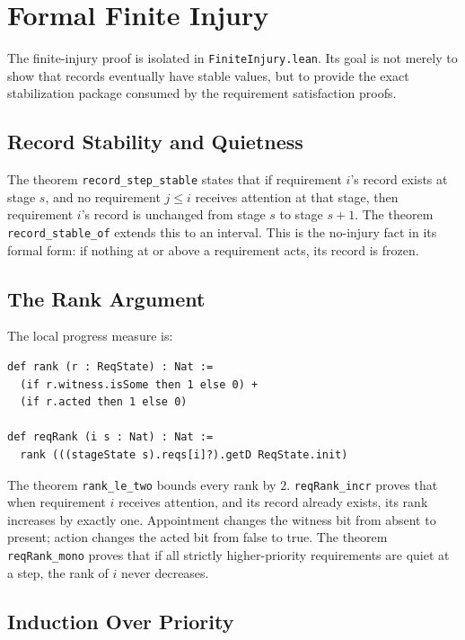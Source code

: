 \section{Formal Finite Injury}

The finite-injury proof is isolated in \texttt{FiniteInjury.lean}.  Its
goal is not merely to show that records eventually have stable values, but
to provide the exact stabilization package consumed by the requirement
satisfaction proofs.

\subsection{Record Stability and Quietness}

The theorem \texttt{record_step_stable} states that if requirement \(i\)'s
record exists at stage \(s\), and no requirement \(j\leq i\) receives
attention at that stage, then requirement \(i\)'s record is unchanged from
stage \(s\) to stage \(s+1\).  The theorem \texttt{record_stable_of}
extends this to an interval.  This is the no-injury fact in its formal
form: if nothing at or above a requirement acts, its record is frozen.

\subsection{The Rank Argument}

The local progress measure is:

\begin{lstlisting}
def rank (r : ReqState) : Nat :=
  (if r.witness.isSome then 1 else 0) +
  (if r.acted then 1 else 0)

def reqRank (i s : Nat) : Nat :=
  rank (((stageState s).reqs[i]?).getD ReqState.init)
\end{lstlisting}

The theorem \texttt{rank_le_two} bounds every rank by \(2\).
\texttt{reqRank_incr} proves that when requirement \(i\) receives
attention, and its record already exists, its rank increases by exactly
one.  Appointment changes the witness bit from absent to present; action
changes the acted bit from false to true.  The theorem
\texttt{reqRank_mono} proves that if all strictly higher-priority
requirements are quiet at a step, the rank of \(i\) never decreases.

\subsection{Induction Over Priority}

